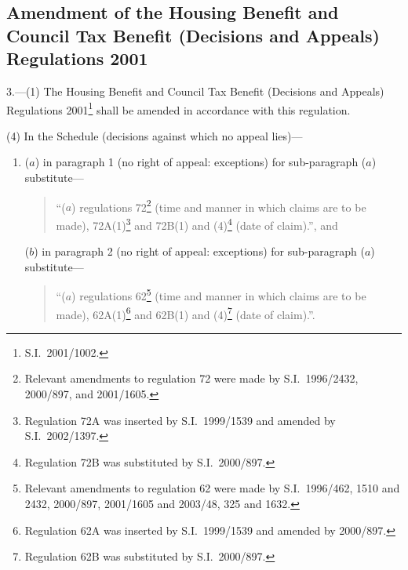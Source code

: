 \documentclass[12pt,a4paper]{article}
\begin{document}

\subsection[3. Amendment of the Housing Benefit and Council Tax Benefit (Decisions and Appeals) Regulations 2001]{Amendment of the Housing Benefit and Council Tax Benefit (Decisions and Appeals) Regulations 2001}

3.---(1)  The Housing Benefit and Council Tax Benefit (Decisions and Appeals) Regulations 2001\footnote{S.I.\ 2001/1002.} shall be amended in accordance with this regulation.

%
%

(4) In the Schedule (decisions against which no appeal lies)—
\begin{enumerate}\item[]
($a$) in paragraph 1 (no right of appeal: exceptions) for sub-paragraph ($a$)  substitute—
\begin{quotation}
“($a$) regulations 72\footnote{Relevant amendments to regulation 72 were made by S.I.\ 1996/2432, 2000/897, and 2001/1605.} (time and manner in which claims are to be made), 72A(1)\footnote{Regulation 72A was inserted by S.I.\ 1999/1539 and amended by S.I.\ 2002/1397.} and 72B(1) and (4)\footnote{Regulation 72B was substituted by S.I.\ 2000/897.} (date of claim).”, and
\end{quotation}

($b$) in paragraph 2 (no right of appeal: exceptions) for sub-paragraph ($a$)  substitute—
\begin{quotation}
“($a$) regulations 62\footnote{Relevant amendments to regulation 62 were made by S.I.\ 1996/462, 1510 and 2432, 2000/897, 2001/1605 and 2003/48, 325 and 1632.} (time and manner in which claims are to be made), 62A(1)\footnote{Regulation 62A was inserted by S.I.\ 1999/1539 and amended by 2000/897.} and 62B(1) and (4)\footnote{Regulation 62B was substituted by S.I.\ 2000/897.} (date of claim).”.
\end{quotation}
\end{enumerate}
\end{document}
